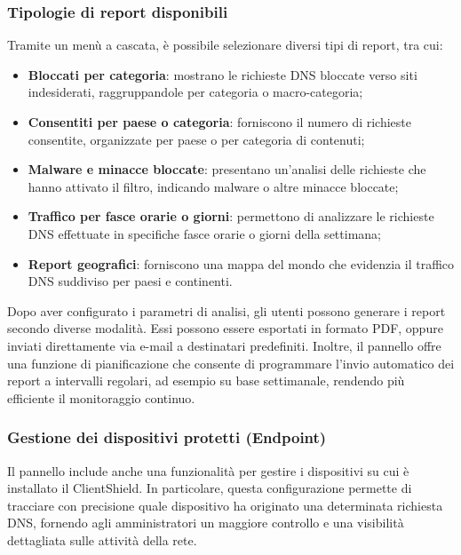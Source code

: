 \subsubsection{Tipologie di report disponibili}
Tramite un menù a cascata, è possibile selezionare diversi tipi di report, tra cui:
\begin{itemize}
  \item \textbf{Bloccati per categoria}: mostrano le richieste DNS bloccate verso siti indesiderati, raggruppandole per categoria o macro-categoria;
  \item \textbf{Consentiti per paese o categoria}: forniscono il numero di richieste consentite, organizzate per paese o per categoria di contenuti;
  \item \textbf{Malware e minacce bloccate}: presentano un’analisi delle richieste che hanno attivato il filtro, indicando malware o altre minacce bloccate;
  \item \textbf{Traffico per fasce orarie o giorni}: permettono di analizzare le richieste DNS effettuate in specifiche fasce orarie o giorni della settimana;
  \item \textbf{Report geografici}: forniscono una mappa del mondo che evidenzia il traffico DNS suddiviso per paesi e continenti.
\end{itemize}

Dopo aver configurato i parametri di analisi, gli utenti possono generare i report secondo diverse modalità. Essi possono essere esportati in formato PDF, oppure inviati direttamente via e-mail a destinatari predefiniti. Inoltre, il pannello offre una funzione di pianificazione che consente di programmare l'invio automatico dei report a intervalli regolari, ad esempio su base settimanale, rendendo più efficiente il monitoraggio continuo.

\subsubsection{Gestione dei dispositivi protetti (Endpoint)}
Il pannello include anche una funzionalità per gestire i dispositivi su cui è installato il ClientShield. In particolare, questa configurazione permette di tracciare con precisione quale dispositivo ha originato una determinata richiesta DNS, fornendo agli amministratori un maggiore controllo e una visibilità dettagliata sulle attività della rete.

